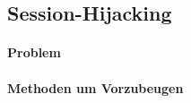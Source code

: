 \subsection{Session-Hijacking}
\label{sec:content_security_session-hijacking}
\paragraph{Problem}


\paragraph{Methoden um Vorzubeugen}
